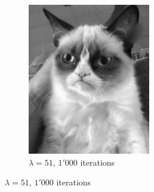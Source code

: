 \documentclass{paper}
\begin{document}
\begin{figure}[ht]
\begin{subfigure}[h]{0.45\textwidth}
	\includegraphics[width=\textwidth]{cat-iter1000-lambda51-alpha0_01}
	\caption*{$\lambda = 51$, $1'000$ iterations}
\end{subfigure}


\end{figure}
\end{document}
